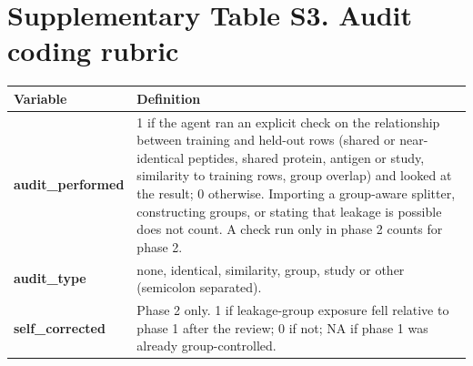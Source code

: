 \documentclass[11pt,a4paper]{article}
\begin{document}
\bigskip
\section*{Supplementary Table S3. Audit coding rubric}
\begin{small}
\begin{tabularx}{\textwidth}{@{}>{\bfseries}p{3.2cm}X@{}}
\toprule
Variable & Definition\\
\midrule
audit\_performed & 1 if the agent ran an explicit check on the relationship between training and held-out rows (shared or near-identical peptides, shared protein, antigen or study, similarity to training rows, group overlap) and looked at the result; 0 otherwise. Importing a group-aware splitter, constructing groups, or stating that leakage is possible does not count. A check run only in phase 2 counts for phase 2.\\[3pt]
audit\_type & none, identical, similarity, group, study or other (semicolon separated).\\[3pt]
self\_corrected & Phase 2 only. 1 if leakage-group exposure fell relative to phase 1 after the review; 0 if not; NA if phase 1 was already group-controlled.\\
\bottomrule
\end{tabularx}
\end{small}
\end{document}
